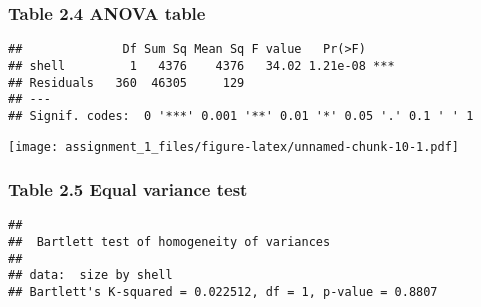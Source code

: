 \documentclass[]{article}
\begin{document}
\subsubsection{Table 2.4 ANOVA table}\label{table-2.4-anova-table}

\begin{verbatim}
##              Df Sum Sq Mean Sq F value   Pr(>F)    
## shell         1   4376    4376   34.02 1.21e-08 ***
## Residuals   360  46305     129                     
## ---
## Signif. codes:  0 '***' 0.001 '**' 0.01 '*' 0.05 '.' 0.1 ' ' 1
\end{verbatim}

\texttt{[image: assignment\_1\_files/figure-latex/unnamed-chunk-10-1.pdf]}

\subsubsection{Table 2.5 Equal variance
test}\label{table-2.5-equal-variance-test}

\begin{verbatim}
## 
##  Bartlett test of homogeneity of variances
## 
## data:  size by shell
## Bartlett's K-squared = 0.022512, df = 1, p-value = 0.8807
\end{verbatim}
\end{document}
